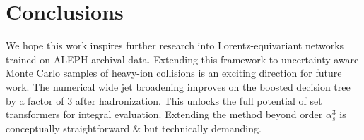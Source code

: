 \section{Conclusions}\label{sec:conclusions}

We hope this work inspires further research into Lorentz-equivariant
networks trained on ALEPH archival data. Extending this framework to
uncertainty-aware Monte Carlo samples of heavy-ion collisions is an
exciting direction for future work. The numerical wide jet broadening
improves on the boosted decision tree by a factor of 3 after
hadronization. This unlocks the full potential of set transformers for
integral evaluation. Extending the method beyond order $\alpha_s^3$ is
conceptually straightforward & but technically demanding.

